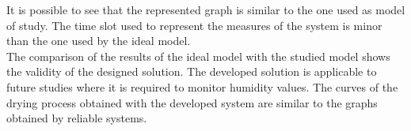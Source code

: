It is possible to see that the represented graph is similar to the one used as model of study. The time slot used to represent the measures of the system is minor than the one used by the ideal model.\\

The comparison of the results of the ideal model with the studied model shows the validity of the designed solution. The developed solution is applicable to future studies where it is required to monitor humidity values. The curves of the drying process obtained with the developed system are similar to the graphs obtained by reliable systems.\\

\newpage


